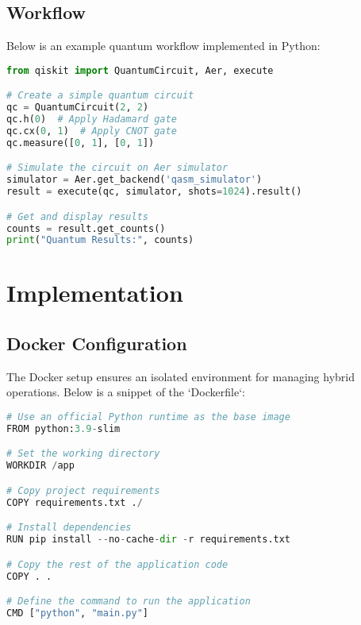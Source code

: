 \documentclass[12pt,a4paper]{article}
\begin{document}
\subsection{Workflow}
Below is an example quantum workflow implemented in Python:

\begin{tcolorbox}[title=Quantum Circuit Example, colback=gray!5!white, colframe=blue!75!black]
\begin{lstlisting}[language=Python]
from qiskit import QuantumCircuit, Aer, execute

# Create a simple quantum circuit
qc = QuantumCircuit(2, 2)
qc.h(0)  # Apply Hadamard gate
qc.cx(0, 1)  # Apply CNOT gate
qc.measure([0, 1], [0, 1])

# Simulate the circuit on Aer simulator
simulator = Aer.get_backend('qasm_simulator')
result = execute(qc, simulator, shots=1024).result()

# Get and display results
counts = result.get_counts()
print("Quantum Results:", counts)
\end{lstlisting}
\end{tcolorbox}

\section{Implementation}
\subsection{Docker Configuration}
The Docker setup ensures an isolated environment for managing hybrid operations. Below is a snippet of the `Dockerfile`:

\begin{tcolorbox}[title=Dockerfile Example, colback=gray!5!white, colframe=blue!75!black]
\begin{lstlisting}[language=Python]
# Use an official Python runtime as the base image
FROM python:3.9-slim

# Set the working directory
WORKDIR /app

# Copy project requirements
COPY requirements.txt ./

# Install dependencies
RUN pip install --no-cache-dir -r requirements.txt

# Copy the rest of the application code
COPY . .

# Define the command to run the application
CMD ["python", "main.py"]
\end{lstlisting}
\end{tcolorbox}

\end{document}
